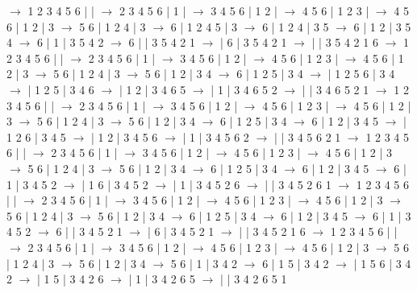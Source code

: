 \documentclass{article}
\begin{document}
\newline
 $\rightarrow$ 1 2 3 4 5 6 |  |  $\rightarrow$ 2 3 4 5 6 | 1 |  $\rightarrow$ 3 4 5 6 | 1 2 |  $\rightarrow$ 4 5 6 | 1 2 3 |  $\rightarrow$ 4 5 6 | 1 2 | 3 $\rightarrow$ 5 6 | 1 2 4 | 3 $\rightarrow$ 6 | 1 2 4 5 | 3 $\rightarrow$ 6 | 1 2 4 | 3 5 $\rightarrow$ 6 | 1 2 | 3 5 4 $\rightarrow$ 6 | 1 | 3 5 4 2 $\rightarrow$ 6 |  | 3 5 4 2 1 $\rightarrow$  | 6 | 3 5 4 2 1 $\rightarrow$  |  | 3 5 4 2 1 6
\newline
 $\rightarrow$ 1 2 3 4 5 6 |  |  $\rightarrow$ 2 3 4 5 6 | 1 |  $\rightarrow$ 3 4 5 6 | 1 2 |  $\rightarrow$ 4 5 6 | 1 2 3 |  $\rightarrow$ 4 5 6 | 1 2 | 3 $\rightarrow$ 5 6 | 1 2 4 | 3 $\rightarrow$ 5 6 | 1 2 | 3 4 $\rightarrow$ 6 | 1 2 5 | 3 4 $\rightarrow$  | 1 2 5 6 | 3 4 $\rightarrow$  | 1 2 5 | 3 4 6 $\rightarrow$  | 1 2 | 3 4 6 5 $\rightarrow$  | 1 | 3 4 6 5 2 $\rightarrow$  |  | 3 4 6 5 2 1
\newline
 $\rightarrow$ 1 2 3 4 5 6 |  |  $\rightarrow$ 2 3 4 5 6 | 1 |  $\rightarrow$ 3 4 5 6 | 1 2 |  $\rightarrow$ 4 5 6 | 1 2 3 |  $\rightarrow$ 4 5 6 | 1 2 | 3 $\rightarrow$ 5 6 | 1 2 4 | 3 $\rightarrow$ 5 6 | 1 2 | 3 4 $\rightarrow$ 6 | 1 2 5 | 3 4 $\rightarrow$ 6 | 1 2 | 3 4 5 $\rightarrow$  | 1 2 6 | 3 4 5 $\rightarrow$  | 1 2 | 3 4 5 6 $\rightarrow$  | 1 | 3 4 5 6 2 $\rightarrow$  |  | 3 4 5 6 2 1
\newline
 $\rightarrow$ 1 2 3 4 5 6 |  |  $\rightarrow$ 2 3 4 5 6 | 1 |  $\rightarrow$ 3 4 5 6 | 1 2 |  $\rightarrow$ 4 5 6 | 1 2 3 |  $\rightarrow$ 4 5 6 | 1 2 | 3 $\rightarrow$ 5 6 | 1 2 4 | 3 $\rightarrow$ 5 6 | 1 2 | 3 4 $\rightarrow$ 6 | 1 2 5 | 3 4 $\rightarrow$ 6 | 1 2 | 3 4 5 $\rightarrow$ 6 | 1 | 3 4 5 2 $\rightarrow$  | 1 6 | 3 4 5 2 $\rightarrow$  | 1 | 3 4 5 2 6 $\rightarrow$  |  | 3 4 5 2 6 1
\newline
 $\rightarrow$ 1 2 3 4 5 6 |  |  $\rightarrow$ 2 3 4 5 6 | 1 |  $\rightarrow$ 3 4 5 6 | 1 2 |  $\rightarrow$ 4 5 6 | 1 2 3 |  $\rightarrow$ 4 5 6 | 1 2 | 3 $\rightarrow$ 5 6 | 1 2 4 | 3 $\rightarrow$ 5 6 | 1 2 | 3 4 $\rightarrow$ 6 | 1 2 5 | 3 4 $\rightarrow$ 6 | 1 2 | 3 4 5 $\rightarrow$ 6 | 1 | 3 4 5 2 $\rightarrow$ 6 |  | 3 4 5 2 1 $\rightarrow$  | 6 | 3 4 5 2 1 $\rightarrow$  |  | 3 4 5 2 1 6
\newline
 $\rightarrow$ 1 2 3 4 5 6 |  |  $\rightarrow$ 2 3 4 5 6 | 1 |  $\rightarrow$ 3 4 5 6 | 1 2 |  $\rightarrow$ 4 5 6 | 1 2 3 |  $\rightarrow$ 4 5 6 | 1 2 | 3 $\rightarrow$ 5 6 | 1 2 4 | 3 $\rightarrow$ 5 6 | 1 2 | 3 4 $\rightarrow$ 5 6 | 1 | 3 4 2 $\rightarrow$ 6 | 1 5 | 3 4 2 $\rightarrow$  | 1 5 6 | 3 4 2 $\rightarrow$  | 1 5 | 3 4 2 6 $\rightarrow$  | 1 | 3 4 2 6 5 $\rightarrow$  |  | 3 4 2 6 5 1
\end{document}

